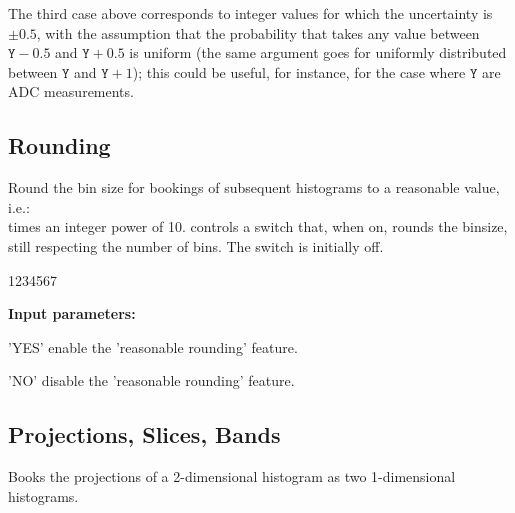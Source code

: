 The third case above corresponds to integer  values for which the
uncertainty is $\pm0.5$, with the assumption that the probability that
 takes any value between $\mathtt{Y}-0.5$ and $\mathtt{Y}+0.5$ 
is uniform (the same argument goes for  uniformly 
distributed between $\mathtt{Y}$ and $\mathtt{Y}+1$); 
this could be useful, for instance, for the case
where $\mathtt{Y}$ are ADC measurements.
%

\subsection{Rounding}
\label{HROUNDIN}


\Action Round the bin size for bookings of subsequent histograms
to a reasonable value, i.e.:\\
 times an integer power of 10.
 controls a switch that, when on, rounds the binsize, still
respecting the number of bins. The switch is
initially off.

\begin{DLttc}{1234567}
\item[{\rm\bf Input parameters:}]
\item['YES'] enable the 'reasonable rounding' feature.
\item['NO'] disable the 'reasonable rounding' feature.
\end{DLttc}

\subsection{Projections, Slices, Bands}
\label{HPROSLBA}


\Action Books the projections of a 2-dimensional histogram
as two 1-dimensional histograms.

